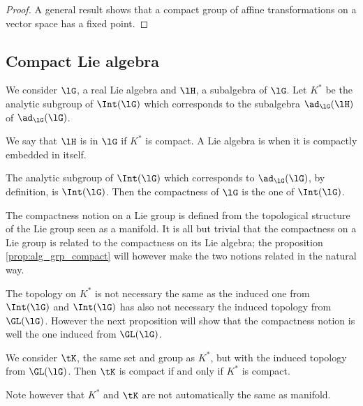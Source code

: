 \begin{proof}
A general result shows that a compact group of affine transformations on a vector space has a fixed point.

\end{proof}

\subsection{Compact Lie algebra}\label{pg:compact_Lie}

We consider $\lG$, a real Lie algebra and $\lH$, a subalgebra of $\lG$. Let $K^*$ be the analytic subgroup of $\Int(\lG)$ which corresponds to the subalgebra $\ad_{\lG}(\lH)$ of $\ad_{\lG}(\lG)$. 

\begin{definition}
We say that $\lH$ is  in $\lG$ if $K^*$ is compact. A Lie algebra is  when it is compactly embedded in itself.
\end{definition}

The analytic subgroup of $\Int(\lG)$ which corresponds to $\ad_{\lG}(\lG)$, by definition, is $\Int(\lG)$. Then the compactness of $\lG$ is the one of $\Int(\lG)$.

\begin{remark}
The compactness notion on a Lie group is defined from the topological structure of the Lie group seen as a manifold. It is all but trivial that the compactness on a Lie group is related to the compactness on its Lie algebra; the proposition \ref{prop:alg_grp_compact} will however make the two notions related in the natural way.
\end{remark}

\begin{remark}
The topology on $K^*$ is not necessary the same as the induced one from $\Int(\lG)$ and $\Int(\lG)$ has also not necessary the induced topology from $\GL(\lG)$. However the next proposition will show that the compactness notion is well the one induced from $\GL(\lG)$.
\end{remark}

\begin{proposition}
We consider $\tK$, the same set and group as $K^*$, but with the induced topology from $\GL(\lG)$. Then $\tK$ is compact if and only if $K^*$ is compact.
\end{proposition}

Note however that $K^*$ and $\tK$ are not automatically the same as manifold.

